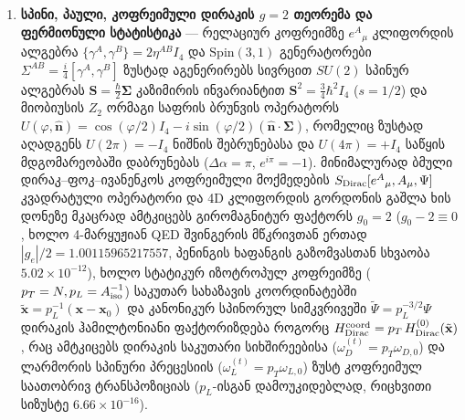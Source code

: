 \documentclass[11pt,a4paper]{article}
\begin{document}
\begin{enumerate}[label=\arabic*.]
\item \textbf{სპინი, პაული, კოფრეიმული დირაკის $g=2$ თეორემა და ფერმიონული სტატისტიკა} — რელაციურ კოფრეიმზე $e^A{}_\mu$ კლიფორდის ალგებრა $\{\gamma^A, \gamma^B\} = 2\eta^{AB}I_4$ და $\mathrm{Spin}(3,1)$ გენერატორები $\Sigma^{AB} = \frac{i}{4}[\gamma^A, \gamma^B]$ ზუსტად აგენერირებს სივრცით $SU(2)$ სპინურ ალგებრას $\mathbf{S} = \frac{\hbar}{2}\boldsymbol{\Sigma}$ კაზიმირის ინვარიანტით $\mathbf{S}^2 = \frac{3}{4}\hbar^2 I_4$ ($s=1/2$) და მიობიუსის $Z_2$ ორმაგი საფრის ბრუნვის ოპერატორს $U(\varphi, \hat{\mathbf{n}}) = \cos(\varphi/2)I_4 - i\sin(\varphi/2)(\hat{\mathbf{n}}\cdot\boldsymbol{\Sigma})$, რომელიც ზუსტად აღადგენს $U(2\pi) = -I_4$ ნიშნის შებრუნებასა და $U(4\pi) = +I_4$ საწყის მდგომარეობაში დაბრუნებას ($\Delta\alpha = \pi$, $e^{i\pi} = -1$). მინიმალურად ბმული დირაკ–ფოკ–ივანენკოს კოფრეიმული მოქმედების $S_{\rm Dirac}[e^A{}_\mu, A_\mu, \Psi]$ კვადრატული ოპერატორი და 4D კლიფორდის გორდონის გაშლა ხის დონეზე მკაცრად ამტკიცებს გირომაგნიტურ ფაქტორს \textbf{$g_0 = 2$} ($g_0 - 2 \equiv 0$, ხოლო 4-მარყუჟიან QED შვინგერის მწკრივთან ერთად $|g_e|/2 = 1.00115965217557$, პენინგის ხაფანგის გაზომვასთან სხვაობა $5.02\times 10^{-12}$), ხოლო სტატიკურ იზოტროპულ კოფრეიმზე ($p_T = N, p_L = A_{\rm iso}^{-1}$) საკუთარ სახაზავის კოორდინატებში $\tilde{\mathbf{x}} = p_L^{-1}(\mathbf{x}-\mathbf{x}_0)$ და კანონიკურ სპინორულ სიმკვრივეში $\widetilde{\Psi} = p_L^{-3/2}\Psi$ დირაკის ჰამილტონიანი ფაქტორიზდება როგორც $H_{\rm Dirac}^{\rm coord} = p_T\,H_{\rm Dirac}^{(0)}(\tilde{\mathbf{x}})$, რაც ამტკიცებს დირაკის საკუთარი სიხშირეებისა ($\omega_D^{(t)} = p_T\omega_{D,0}$) და ლარმორის სპინური პრეცესიის ($\omega_L^{(t)} = p_T\omega_{L,0}$) ზუსტ კოფრეიმულ საათობრივ ტრანსპოზიციას ($p_L$-ისგან დამოუკიდებლად, რიცხვითი სიზუსტე $6.66\times 10^{-16}$).


\end{enumerate}
\end{document}
